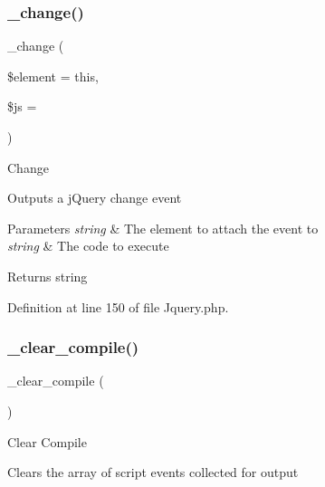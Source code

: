\mbox{\label{class_c_i___jquery_abcb287d50d267968e11a1cb63637bfbb}} 
\subsubsection{\texorpdfstring{\_change()}{\_change()}}
{\footnotesize\ttfamily \+\_\+change (\begin{DoxyParamCaption}\item[{}]{\$element = {\ttfamily \textquotesingle{}this\textquotesingle{}},  }\item[{}]{\$js = {\ttfamily \textquotesingle{}\textquotesingle{}} }\end{DoxyParamCaption})\hspace{0.3cm}{\ttfamily [protected]}}

Change

Outputs a j\+Query change event


\begin{DoxyParams}{Parameters}
{\em string} & The element to attach the event to \\
\hline
{\em string} & The code to execute \\
\hline
\end{DoxyParams}
\begin{DoxyReturn}{Returns}
string 
\end{DoxyReturn}


Definition at line 150 of file Jquery.\+php.

\mbox{\label{class_c_i___jquery_a8508147ee3b37f58e7c58f365c6c1409}} 
\subsubsection{\texorpdfstring{\_clear\_compile()}{\_clear\_compile()}}
{\footnotesize\ttfamily \+\_\+clear\+\_\+compile (\begin{DoxyParamCaption}{ }\end{DoxyParamCaption})\hspace{0.3cm}{\ttfamily [protected]}}

Clear Compile

Clears the array of script events collected for output

